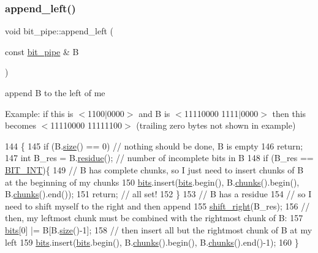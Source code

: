 \subsubsection{\texorpdfstring{append\+\_\+left()}{append\_left()}}
{\footnotesize\ttfamily void bit\+\_\+pipe\+::append\+\_\+left (\begin{DoxyParamCaption}\item[{const \hyperlink{classbit__pipe}{bit\+\_\+pipe} \&}]{B }\end{DoxyParamCaption})}



append B to the left of me 

Example\+: if this is $<$1100$\vert$0000$>$ and B is $<$11110000 1111$\vert$0000$>$ then this becomes $<$11110000 11111100$>$ (trailing zero bytes not shown in example) 
\begin{DoxyCode}
144                                            \{
145   \textcolor{keywordflow}{if} (B.\hyperlink{classbit__pipe_a4bdc57f1f598bfad0eaa40860f17000c}{size}() == 0) \textcolor{comment}{// nothing should be done, B is empty}
146     \textcolor{keywordflow}{return};
147   \textcolor{keywordtype}{int} B\_res = B.\hyperlink{classbit__pipe_a283f47fa4422ac50b9b28e8f276f7252}{residue}(); \textcolor{comment}{// number of incomplete bits in B}
148   \textcolor{keywordflow}{if} (B\_res == \hyperlink{bitstream_8h_afcadf5aa65c5159bfb96c4d82ebc0a5d}{BIT\_INT})\{
149     \textcolor{comment}{// B has complete chunks, so I just need to insert chunks of B at the beginning of my chunks}
150     \hyperlink{classbit__pipe_a86f38af1e9736b053728033490476b50}{bits}.insert(\hyperlink{classbit__pipe_a86f38af1e9736b053728033490476b50}{bits}.begin(), B.\hyperlink{classbit__pipe_aebf19a4d9425e5ca10fc4fd3d78cada2}{chunks}().begin(), B.\hyperlink{classbit__pipe_aebf19a4d9425e5ca10fc4fd3d78cada2}{chunks}().end());
151     \textcolor{keywordflow}{return}; \textcolor{comment}{// all set!}
152   \}
153   \textcolor{comment}{// B has a residue}
154   \textcolor{comment}{// so I need to shift myself to the right and then append}
155   \hyperlink{classbit__pipe_a341a1f62d728a67f730503ca722a7770}{shift\_right}(B\_res);
156   \textcolor{comment}{// then, my leftmost chunk must be combined with the rightmost chunk of B:}
157   \hyperlink{classbit__pipe_a86f38af1e9736b053728033490476b50}{bits}[0] |= B[B.\hyperlink{classbit__pipe_a4bdc57f1f598bfad0eaa40860f17000c}{size}()-1];
158   \textcolor{comment}{// then insert all but the rightmost chunk of B at my left}
159   \hyperlink{classbit__pipe_a86f38af1e9736b053728033490476b50}{bits}.insert(\hyperlink{classbit__pipe_a86f38af1e9736b053728033490476b50}{bits}.begin(), B.\hyperlink{classbit__pipe_aebf19a4d9425e5ca10fc4fd3d78cada2}{chunks}().begin(), B.\hyperlink{classbit__pipe_aebf19a4d9425e5ca10fc4fd3d78cada2}{chunks}().end()-1);
160 \}
\end{DoxyCode}
\mbox{\label{classbit__pipe_aebf19a4d9425e5ca10fc4fd3d78cada2}} 
